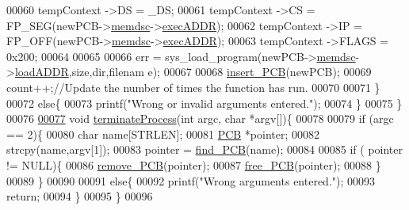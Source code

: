 \begin{DoxyCode}
00060                 tempContext ->DS = \_DS;
00061                 tempContext ->CS = FP\_SEG(newPCB->\hyperlink{structprocess_a163551ab7b60184b48e5d440fcd5c2b8}{memdsc}->\hyperlink{structmem_a5340491e17307817e6dca3b1d260d18a}{execADDR});
00062                 tempContext ->IP = FP\_OFF(newPCB->\hyperlink{structprocess_a163551ab7b60184b48e5d440fcd5c2b8}{memdsc}->\hyperlink{structmem_a5340491e17307817e6dca3b1d260d18a}{execADDR});
00063                 tempContext ->FLAGS = 0x200;
00064                 
00065                 
00066                  err = sys\_load\_program(newPCB->\hyperlink{structprocess_a163551ab7b60184b48e5d440fcd5c2b8}{memdsc}->\hyperlink{structmem_a8f5a4db03ee0560e6bd4dd602ad753c0}{loadADDR},size,dir,filenam
      e);
00067                 
00068                 \hyperlink{mpx__r2_8c_aa3b334e3a5afd6e590917667ad359a6f}{insert_PCB}(newPCB);     
00069                 count++;\textcolor{comment}{//Update the number of times the function has run.}
00070                 
00071         \}
00072         \textcolor{keywordflow}{else}\{
00073                 printf(\textcolor{stringliteral}{"Wrong or invalid arguments entered."});
00074         \}
00075 \}
00076 
\hypertarget{mpx__r4_8c_8_b_a_s_e_8c_source_l00077}{}\hyperlink{mpx__r4_8c_8_b_a_s_e_8c_aaa714b85ce262f949d018430daf6da00}{00077} \textcolor{keywordtype}{void} \hyperlink{mpx__r4_8c_aaa714b85ce262f949d018430daf6da00}{terminateProcess}(\textcolor{keywordtype}{int} argc, \textcolor{keywordtype}{char} *argv[])\{
00078 
00079         \textcolor{keywordflow}{if} (argc == 2)\{
00080                 \textcolor{keywordtype}{char} name[STRLEN];
00081                 \hyperlink{structprocess}{PCB} *pointer;
00082                 strcpy(name,argv[1]);
00083                 pointer = \hyperlink{mpx__r2_8c_a612a6abcb66c688a32f33abc93ff3990}{find_PCB}(name);
00084         
00085                 \textcolor{keywordflow}{if} ( pointer != NULL)\{
00086                         \hyperlink{mpx__r2_8c_af30a3658210d449b4b53e5be2ed2bc2e}{remove_PCB}(pointer);
00087                         \hyperlink{mpx__r2_8c_a79890f055b1d0fccf1962bbde4877caa}{free_PCB}(pointer);
00088                 \}
00089         \}
00090         
00091         \textcolor{keywordflow}{else}\{
00092                 printf(\textcolor{stringliteral}{"Wrong arguments entered."});
00093                 \textcolor{keywordflow}{return};
00094         \}
00095 \}
00096 
\end{DoxyCode}
